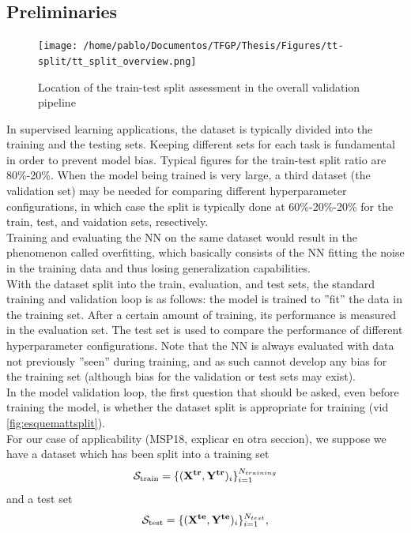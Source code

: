 \subsection{Preliminaries}
\begin{figure}[!b]
	\centering
	\texttt{[image: /home/pablo/Documentos/TFGP/Thesis/Figures/tt-split/tt\_split\_overview.png]}
	\caption{Location of the train-test split assessment in the overall validation pipeline}
	\label{fig:esquemattsplit}
\end{figure}
\indent In supervised learning applications, the dataset is typically divided into the training and the testing sets. Keeping different sets for each task is fundamental in order to prevent model bias. Typical figures for the train-test split ratio are 80\%-20\%. When the model being trained is very large, a third dataset (the validation set) may be needed for comparing different hyperparameter configurations, in which case the split is typically done at 60\%-20\%-20\% for the train, test, and vaidation sets, resectively\cite[pp. 20-21]{Marsland2015Machine}.\\
%
\indent Training and evaluating the NN on the same dataset would result in the phenomenon called overfitting\cite[pp. 19-20]{Marsland2015Machine}, which basically consists of the NN fitting the noise in the training data and thus losing generalization capabilities.\\
%
\indent With the dataset split into the train, evaluation, and test sets, the standard training and validation loop is as follows: the model is trained to ''fit'' the data in the training set. After a certain amount of training, its performance is measured in the evaluation set. The test set is used to compare the performance of different hyperparameter configurations. Note that the NN is always evaluated with data not previously ''seen'' during training, and as such cannot develop any bias for the training set (although bias for the validation or test sets may exist).\\
%
\indent In the model validation loop, the first question that should be asked, even before training the model, is whether the dataset split is appropriate for training (vid \autoref{fig:esquemattsplit}).\\
%
\indent For our case of applicability (MSP18, explicar en otra seccion), we suppose we have a dataset which has been split into a training set
$${\cal S}_{\text{train}}=\{({\bf X^{tr}},{\bf Y^{tr}})_i\}_{i=1}^{N_{training}}$$
and a test set
$${\cal S}_{\text{test}}=\{({\bf X^{te}},{\bf Y^{te}})_i\}_{i=1}^{N_{test}},$$
